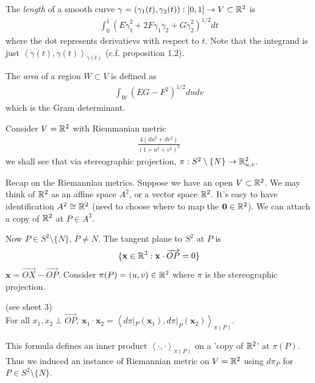 \documentclass[a4paper]{article}
\begin{document}
\begin{defi}
The \emph{length} of a smooth curve $\gamma = (\gamma_1(t),\gamma_2(t)) : [0,1] \to V \subset \mathbb{R}^2$ is
\begin{equation*}
\begin{aligned}
\int_0^1 \left(E\dot{\gamma}_1^2 + 2F\dot{\gamma}_1\dot{\gamma}_2 + G\dot{\gamma}_2^2\right)^{1/2} dt
\end{aligned}
\end{equation*}
where the dot represents derivatievs with respect to $t$. Note that the integrand is just $\left<\dot{\gamma}(t),\dot{\gamma}(t)\right>_{\gamma(t)}$ (c.f. proposition 1.2).

The \emph{area} of a region $W \subset V$ is defined as
\begin{equation*}
\begin{aligned}
\int_W (EG-F^2)^{1/2} dudv
\end{aligned}
\end{equation*}
which is the Gram determinant.
\end{defi}

\begin{eg}
Consider $V = \mathbb{R}^2$ with Riemmanian metric
\begin{equation*}
\begin{aligned}
\frac{4(du^2+dv^2)}{(1+u^2+v^2)^2}
\end{aligned}
\end{equation*}
we shall see that via stereographic projection, $\pi:S^2 \setminus \{N\} \to \mathbb{R}_{u,v}^2$.
\end{eg}

Recap on the Riemannian metrics. Suppose we have an open $V \subset \mathbb{R}^2$. We may think of $\mathbb{R}^2$ as an affine space $A^2$, or a vector space $\mathbb{R}^2$. It's easy to have identification $A^2 \cong \mathbb{R}^2$ (need to choose where to map the $\mathbf{0} \in \mathbb{R}^2$). We can attach a copy of $\mathbb{R}^2$ at $P \in A^2$.

Now $P \in S^2 \setminus \{N\}$, $P \neq N$. The tangent plane to $S^2$ at $P$ is
\begin{equation*}
\begin{aligned}
\{ \mathbf{x} \in \mathbb{R}^3: \mathbf{x} \cdot \overrightarrow{OP} = 0\}
\end{aligned}
\end{equation*}
$\mathbf{x} = \overrightarrow{OX} - \overrightarrow{OP}$. Consider $\pi(P) = (u,v) \in \mathbb{R}^2$ where $\pi$ is the stereographic projection.

\begin{eg} (see sheet 3)\\
For all $x_1, x_2 \perp \overrightarrow{OP}$, $\mathbf{x}_1 \cdot \mathbf{x}_2 = \left<d\pi|_P(\mathbf{x}_1),d\pi |_P(\mathbf{x}_2)\right>_{\pi(P)}$.

This formula defines an inner product $\left<\cdot,\cdot\right>_{\pi(P)}$ on a 'copy of $\mathbb{R}^2$' at $\pi(P)$. Thus we induced an instance of Riemannian metric on $V=\mathbb{R}^2$ using $d\pi_P$ for $P \in S^2 \setminus \{N\}$.
\end{eg}
\end{document}
